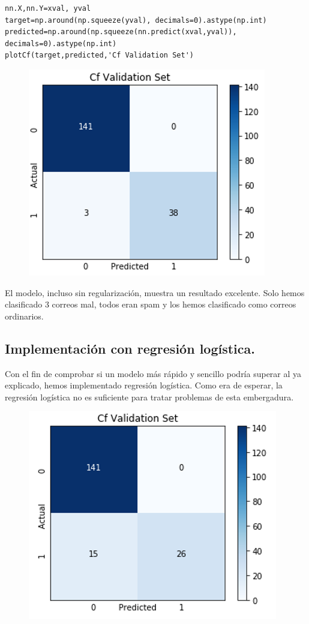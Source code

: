 \documentclass[a4paper,10pt]{article}
\begin{document}
\begin{lstlisting}
nn.X,nn.Y=xval, yval 
target=np.around(np.squeeze(yval), decimals=0).astype(np.int)
predicted=np.around(np.squeeze(nn.predict(xval,yval)), decimals=0).astype(np.int)
plotCf(target,predicted,'Cf Validation Set')
\end{lstlisting}
\begin{figure}[H]
\centering
\includegraphics[scale=0.8]{Annotation 2020-03-23 190419}
\end{figure}
El modelo, incluso sin regularización, muestra un resultado excelente. Solo hemos clasificado 3 correos mal, todos eran spam y los hemos clasificado como correos ordinarios.

\subsection{Implementación con regresión logística.}
Con el fin de comprobar si un modelo más rápido y sencillo podría superar al ya explicado, hemos implementado regresión logística. Como era de esperar, la regresión logística no es suficiente para tratar problemas de esta embergadura.
\begin{figure}[H]
\centering
\includegraphics[scale=0.8]{Annotation 2020-03-23 193133.png}
\end{figure}
\newpage
\end{document}

